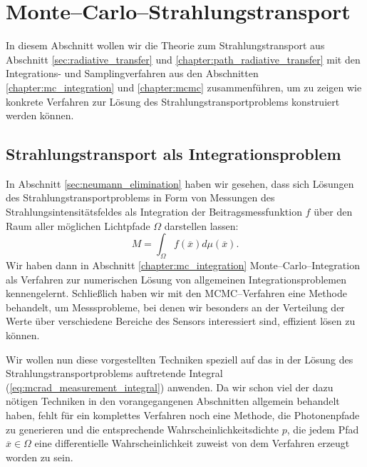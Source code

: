 	\chapter{Monte--Carlo--Strahlungstransport}\label{sec:mc_radiativetransfer}
	In diesem Abschnitt wollen wir die Theorie zum Strahlungstransport aus Abschnitt \ref{sec:radiative_transfer} und \ref{chapter:path_radiative_transfer} mit den Integrations- und Samplingverfahren aus den Abschnitten \ref{chapter:mc_integration} und \ref{chapter:mcmc} zusammenführen, um zu zeigen wie konkrete Verfahren zur Lösung des Strahlungstransportproblems konstruiert werden können.
	\section{Strahlungstransport als Integrationsproblem}
	In Abschnitt \ref{sec:neumann_elimination} haben wir gesehen, dass sich Lösungen des Strahlungstransportproblems in Form von Messungen des Strahlungsintensitätsfeldes als Integration der Beitragsmessfunktion $f$ über den Raum aller möglichen Lichtpfade $\Omega$ darstellen lassen:
	\begin{equation}
		M=\int_\Omega f({\overline x})d\mu({\overline x}).
		\label{eq:mcrad_measurement_integral}
	\end{equation}
	Wir haben dann in Abschnitt \ref{chapter:mc_integration} Monte--Carlo--Integration als Verfahren zur numerischen Lösung von allgemeinen Integrationsproblemen kennengelernt. Schließlich haben wir mit den MCMC--Verfahren eine Methode behandelt, um Messsprobleme, bei denen wir besonders an der Verteilung der Werte über verschiedene Bereiche des Sensors interessiert sind, effizient lösen zu können.
	
	Wir wollen nun diese vorgestellten Techniken speziell auf das in der Lösung des Strahlungstransportproblems auftretende Integral (\ref{eq:mcrad_measurement_integral}) anwenden. Da wir schon viel der dazu nötigen Techniken in den vorangegangenen Abschnitten allgemein behandelt haben, fehlt für ein komplettes Verfahren noch eine Methode, die Photonenpfade zu generieren und die entsprechende Wahrscheinlichkeitsdichte $p$, die jedem Pfad ${\overline x}\in\Omega$ eine differentielle Wahrscheinlichkeit zuweist von dem Verfahren erzeugt worden zu sein.
	

